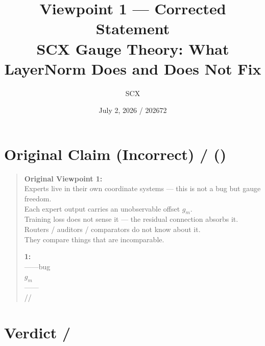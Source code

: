 \documentclass[11pt,a4paper]{article}
\title{\textbf{Viewpoint 1 — Corrected Statement}\\[0.3cm]
\large SCX Gauge Theory: What LayerNorm Does and Does Not Fix}
\author{SCX}
\date{July 2, 2026 / 202672}
\begin{document}
\maketitle

\section{Original Claim (Incorrect) /  ()}

\begin{quote}
\textbf{Original Viewpoint 1:}\\[4pt]
Experts live in their own coordinate systems — this is not a bug but gauge freedom.\\
Each expert output carries an unobservable offset $g_m$.\\
Training loss does not sense it — the residual connection absorbs it.\\
Routers / auditors / comparators do not know about it.\\
They compare things that are incomparable.

\medskip
\textbf{1:}\\[4pt]
——bug\\
$g_m$\\
——\\
//\\

\end{quote}

\section{Verdict / }

\begin{center}
\end{center}
\end{document}

